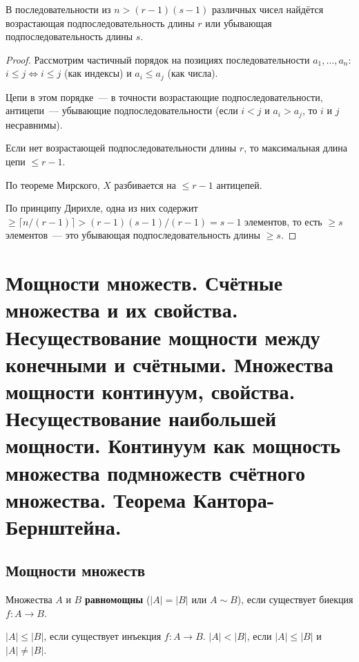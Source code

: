 \documentclass[12pt]{article}
\begin{document}
	\begin{corollary}
		В последовательности из $n > (r-1)(s-1)$ различных чисел найдётся возрастающая подпоследовательность длины $r$ или убывающая подпоследовательность длины $s$.
	\end{corollary}
	
	\begin{proof}
		Рассмотрим частичный порядок на позициях последовательности $a_1, \dots, a_n$: $i \leqslant j \Leftrightarrow i \leqslant j$ (как индексы) и $a_i \leqslant a_j$ (как числа).
		
		Цепи в этом порядке~--- в точности возрастающие подпоследовательности, антицепи~--- убывающие подпоследовательности (если $i < j$ и $a_i > a_j$, то $i$ и $j$ несравнимы).
		
		Если нет возрастающей подпоследовательности длины $r$, то максимальная длина цепи $\leqslant r - 1$.
		
		По теореме Мирского, $X$ разбивается на $\leqslant r - 1$ антицепей.
		
		По принципу Дирихле, одна из них содержит $\geqslant \lceil n/(r-1) \rceil > (r-1)(s-1)/(r-1) = s - 1$ элементов, то есть $\geqslant s$ элементов~--- это убывающая подпоследовательность длины $\geqslant s$.
	\end{proof}
	
	\newpage
	
	\section{Мощности множеств. Счётные множества и их свойства. Несуществование мощности между конечными и счётными. Множества мощности континуум, свойства. Несуществование наибольшей мощности. Континуум как мощность множества подмножеств счётного множества. Теорема Кантора-Бернштейна.}
	
	\subsection{Мощности множеств}
	
	\begin{definition}
		Множества $A$ и $B$ \textbf{равномощны} ($|A| = |B|$ или $A \sim B$), если существует биекция $f: A \to B$.
	\end{definition}
	
	\begin{definition}
		$|A| \leqslant |B|$, если существует инъекция $f: A \to B$. $|A| < |B|$, если $|A| \leqslant |B|$ и $|A| \neq |B|$.
	\end{definition}
	
\end{document}
